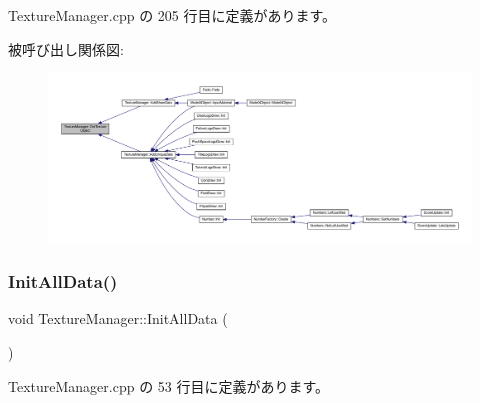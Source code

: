  Texture\+Manager.\+cpp の 205 行目に定義があります。

被呼び出し関係図\+:\nopagebreak
\begin{figure}[H]
\begin{center}
\leavevmode
\includegraphics[width=350pt]{class_texture_manager_a18d1f3418511075804f9d11cff1010ff_icgraph}
\end{center}
\end{figure}
\mbox{\label{class_texture_manager_aee4c784f3f32bfe810bf66313735dece}} 
\subsubsection{\texorpdfstring{Init\+All\+Data()}{InitAllData()}}
{\footnotesize\ttfamily void Texture\+Manager\+::\+Init\+All\+Data (\begin{DoxyParamCaption}{ }\end{DoxyParamCaption})\hspace{0.3cm}{\ttfamily [static]}}



 Texture\+Manager.\+cpp の 53 行目に定義があります。

